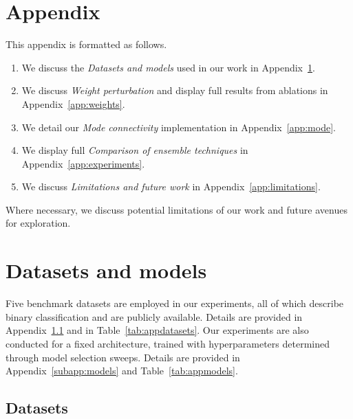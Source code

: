 \pagebreak
\section*{Appendix}

This appendix is formatted as follows.
\begin{enumerate}
    \item We discuss the \textit{Datasets and models} used in our work in Appendix~\ref{app:datasets}.
    \item We discuss \textit{Weight perturbation} and display full results from ablations in Appendix~\ref{app:weights}.
    \item We detail our \textit{Mode connectivity} implementation in Appendix~\ref{app:mode}.
    \item We display full \textit{Comparison of ensemble techniques} in Appendix~\ref{app:experiments}.
    \item We discuss \textit{Limitations and future work} in Appendix~\ref{app:limitations}.
\end{enumerate}
Where necessary, we discuss potential
limitations of our work and future avenues for exploration.

\section{Datasets and models}
\label{app:datasets}

Five benchmark datasets are employed in our experiments, all of which describe binary classification and are publicly available. Details are provided in Appendix~\ref{subapp:datasets} and in Table~\ref{tab:appdatasets}. Our experiments are also conducted for a fixed architecture, trained with hyperparameters determined through model selection sweeps. Details are provided in Appendix~\ref{subapp:models} and Table~\ref{tab:appmodels}.

\subsection{Datasets}
\label{subapp:datasets}

